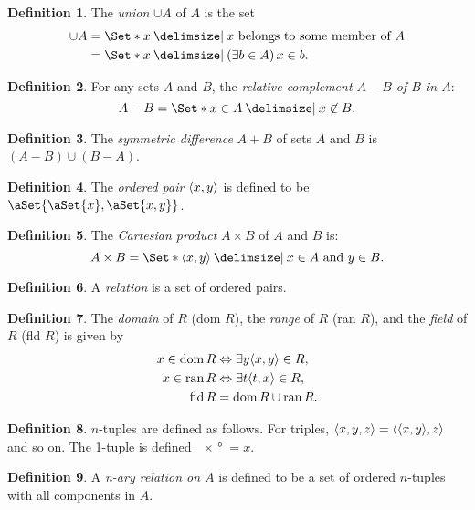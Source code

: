\documentclass[12pt]{article}
\theoremstyle{plain}
\theoremstyle{remark}
\theoremstyle{definition}
\newtheorem{defn}{Definition}[section]
\theoremstyle{remark}
\providecommand\st{}
\newcommand\SetSymbol[1][]{%
  \nonscript\:#1\vert%
  \allowbreak%
  \nonscript\:
\mathopen{}}
\DeclarePairedDelimiter{\ang}{\langle}{\rangle}
\renewcommand\st{\SetSymbol[\delimsize]}
\DeclarePairedDelimiter\aSet\{\}
\renewcommand{\iff}{\Leftrightarrow}
\DeclareMathOperator{\dom}{dom}
\DeclareMathOperator{\ran}{ran}
\DeclareMathOperator{\fld}{fld}
\begin{document}
\begin{defn}
  The \textit{union} $\cup A$ of $A$ is the set
  \begin{align*}
    \cup A &= \Set*{x \st \text{$x$ belongs to some member of $A$}}\\
           &= \Set*{x \st (\exists b \in A)\, x \in b}.
  \end{align*}
\end{defn}

\begin{defn}
  For any sets $A$ and $B$, the \textit{relative complement $A-B$ of $B$ in $A$}:
  \[
    A - B = \Set*{x \in A \st x \not\in B}.
  \]
\end{defn}

\begin{defn}
  The \textit{symmetric difference} $A+B$ of sets $A$ and $B$ is $(A - B) \cup (B - A)$.
\end{defn}

\begin{defn}
  The \textit{ordered pair} $\ang{x, y}$ is defined to be $\aSet{\aSet{x}, \aSet{x, y}}$.
\end{defn}

\begin{defn}
  The \textit{Cartesian product} $A \times B$ of $A$ and $B$ is:
  \[
    A \times B = \Set*{\ang{x,y} \st x \in A\ \text{and}\ y \in B}.
  \]
\end{defn}

\begin{defn}
  A \textit{relation} is a set of ordered pairs.
\end{defn}

\begin{defn}
  The \textit{domain} of $R$ (dom $R$), the \textit{range} of $R$ (ran $R$), and the \textit{field} of $R$ (fld $R$) is given by
  \begin{align*}
    x \in \dom{R} &\iff \exists y \ang{x, y} \in R,\\
    x \in \ran{R} &\iff \exists t \ang{t, x} \in R,\\
    \fld{R} &= \dom{R} \cup \ran{R}.
  \end{align*}
\end{defn}

\begin{defn}
  $n$-tuples are defined as follows. For triples, $\ang{x,y,z} = \ang{\ang{x,y},z }$ and so on. The 1-tuple is defined $\ang{x} = x$.
\end{defn}

\begin{defn}
  A \textit{n-ary relation on $A$} is defined to be a set of ordered $n$-tuples with all components in $A$.
\end{defn}
\end{document}
